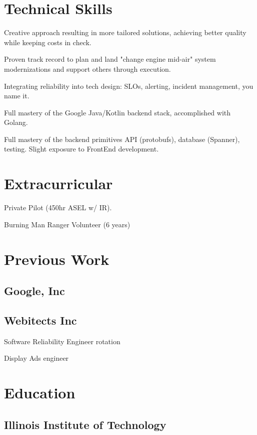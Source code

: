 \documentclass{resume}
\newcommand{\textapprox}{\raisebox{0.5ex}{\texttildelow}}
\begin{document}
\section{Technical Skills}
\begin{compactitem}
  \item Creative approach resulting in more tailored solutions, achieving better quality while keeping costs in check.
  \item Proven track record to plan and land "change engine mid-air" system modernizations and support others through execution.
  \item Integrating reliability into tech design: SLOs, alerting, incident management, you name it.
  \item Full mastery of the Google Java/Kotlin backend stack, accomplished with Golang.
  \item Full mastery of the backend primitives API (protobufs), database (Spanner), testing. Slight exposure to FrontEnd development.
\end{compactitem}

\section{Extracurricular}
\begin{compactitem}
  \item Private Pilot (\textapprox 450hr ASEL w/ IR).
  \item Burning Man Ranger Volunteer (6 years)
\end{compactitem}

\section{Previous Work}

\subsection{Google, Inc}


\subsection{Webitects Inc}


\begin{compactitem}
\item Software Reliability Engineer rotation
\item Display Ads engineer
\end{compactitem}

\section{Education}

\subsection{Illinois Institute of Technology}

\end{document}
